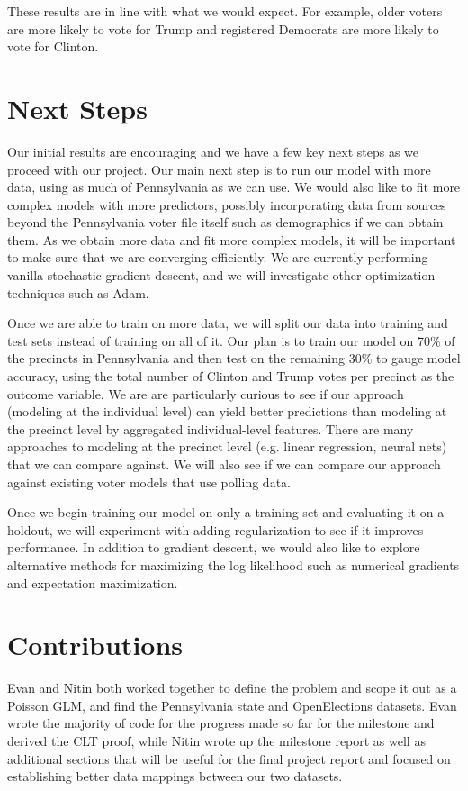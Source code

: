 \documentclass[10pt, letterpaper]{article}
\begin{document}
These results are in line with what we would expect. For example, older voters are more likely to vote for Trump and registered Democrats are more likely to vote for Clinton.

\section{Next Steps}

Our initial results are encouraging and we have a few key next steps as we proceed with our project. Our main next step is to run our model with more data, using as much of Pennsylvania as we can use. We would also like to fit more complex models with more predictors, possibly incorporating data from sources beyond the Pennsylvania voter file itself such as demographics if we can obtain them. As we obtain more data and fit more complex models, it will be important to make sure that we are converging efficiently. We are currently performing vanilla stochastic gradient descent, and we will investigate other optimization techniques such as Adam.

Once we are able to train on more data, we will split our data into training and test sets instead of training on all of it. Our plan is to train our model on 70\% of the precincts in Pennsylvania and then test on the remaining 30\% to gauge model accuracy, using the total number of Clinton and Trump votes per precinct as the outcome variable. We are are particularly curious to see if our approach (modeling at the individual level) can yield better predictions than modeling at the precinct level by aggregated individual-level features. There are many approaches to modeling at the precinct level (e.g. linear regression, neural nets) that we can compare against. We will also see if we can compare our approach against existing voter models that use polling data.

Once we begin training our model on only a training set and evaluating it on a holdout, we will experiment with adding regularization to see if it improves performance. In addition to gradient descent, we would also like to explore alternative methods for maximizing the log likelihood such as numerical gradients and expectation maximization.

\section{Contributions}
Evan and Nitin both worked together to define the problem and scope it out as a Poisson GLM, and find the Pennsylvania state and OpenElections datasets. Evan wrote the majority of code for the progress made so far for the milestone and derived the CLT proof, while Nitin wrote up the milestone report as well as additional sections that will be useful for the final project report and focused on establishing better data mappings between our two datasets.
\end{document}
